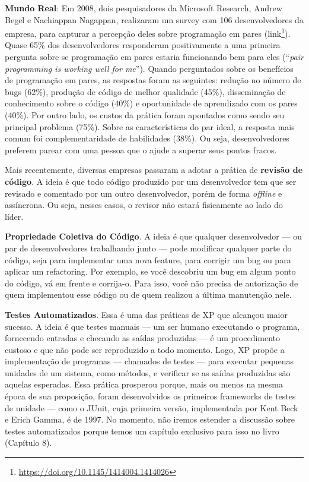 \documentclass[
  11pt,
  twoside]{book}
\DeclareRobustCommand{\href}[2]{#2\footnote{\url{#1}}}
\newenvironment{esmbox}{\centering \vspace{1.5ex} \begin{tcolorbox}[breakable, colback=backcolor, width=4.9in]}{\end{tcolorbox} \vspace{1.5ex}}
\begin{document}

\begin{esmbox}

\textbf{Mundo Real}: Em 2008, dois pesquisadores da Microsoft Research,
Andrew Begel e Nachiappan Nagappan, realizaram um survey com 106
desenvolvedores da empresa, para capturar a percepção deles sobre
programação em pares
(\href{https://doi.org/10.1145/1414004.1414026}{link}). Quase 65\% dos
desenvolvedores responderam positivamente a uma primeira pergunta sobre
se programação em pares estaria funcionando bem para eles (``\emph{pair
programming is working well for me}''). Quando perguntados sobre os
benefícios de programação em pares, as respostas foram as seguintes:
redução no número de bugs (62\%), produção de código de melhor qualidade
(45\%), disseminação de conhecimento sobre o código (40\%) e
oportunidade de aprendizado com os pares (40\%). Por outro lado, os
custos da prática foram apontados como sendo seu principal problema
(75\%). Sobre as características do par ideal, a resposta mais comum foi
complementaridade de habilidades (38\%). Ou seja, desenvolvedores
preferem parear com uma pessoa que o ajude a superar seus pontos fracos.

\end{esmbox}

 Mais recentemente, diversas empresas passaram
a adotar a prática de \textbf{revisão de código}. A ideia é que todo
código produzido por um desenvolvedor tem que ser revisado e comentado
por um outro desenvolvedor, porém de forma \emph{offline} e assíncrona.
Ou seja, nesses casos, o revisor não estará fisicamente ao lado do
líder.

 \textbf{Propriedade Coletiva do
Código}. A ideia é que qualquer desenvolvedor --- ou par de
desenvolvedores trabalhando junto --- pode modificar qualquer parte do
código, seja para implementar uma nova feature, para corrigir um bug ou
para aplicar um refactoring. Por exemplo, se você descobriu um bug em
algum ponto do código, vá em frente e corrija-o. Para isso, você não
precisa de autorização de quem implementou esse código ou de quem
realizou a última manutenção nele.

 \textbf{Testes Automatizados}. Essa é uma das
práticas de XP que alcançou maior sucesso. A ideia é que testes manuais
--- um ser humano executando o programa, fornecendo entradas e checando
as saídas produzidas --- é um procedimento custoso e que não pode ser
reproduzido a todo momento. Logo, XP propõe a implementação de programas
--- chamados de testes --- para executar pequenas unidades de um
sistema, como métodos, e verificar se as saídas produzidas são aquelas
esperadas. Essa prática prosperou porque, mais ou menos na mesma época
de sua proposição, foram desenvolvidos os primeiros frameworks de testes
de unidade --- como o JUnit, cuja primeira versão, implementada por Kent
Beck e Erich Gamma, é de 1997. No momento, não iremos estender a
discussão sobre testes automatizados porque temos um capítulo exclusivo
para isso no livro (Capítulo 8).
\end{document}
